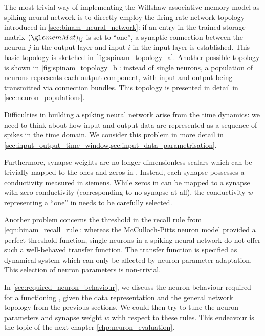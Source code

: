 The most trivial way of implementing the Willshaw associative memory model as spiking neural network is to directly employ the firing-rate network topology introduced in \cref{sec:binam_neural_network}: if an entry in the trained storage matrix \((\memMat)_{ij}\) is set to \enquote{one}, a synaptic connection between the neuron $j$ in the output layer and input $i$ in the input layer is established. This basic topology is sketched in \cref{fig:spinam_topology_a}. Another possible topology is shown in \cref{fig:spinam_topology_b}: instead of single neurons, a population of neurons represents each output component, with input and output being transmitted via connection bundles. This topology is presented in detail in \cref{sec:neuron_populations}.

Difficulties in building a spiking neural network arise from the time dynamics: we need to think about how input and output data are represented as a sequence of spikes in the time domain. We consider this problem in more detail in \cref{sec:input_output_time_window,sec:input_data_parametrisation}.

Furthermore, synapse weights are no longer dimensionless scalars which can be trivially mapped to the ones and zeros in \memMat. Instead, each synapse possesses a conductivity measured in siemens. While zeros in \memMat can be mapped to a synapse with zero conductivity (corresponding to no synapse at all), the conductivity $w$ representing a \enquote{one} in \memMat needs to be carefully selected.

Another problem concerns the threshold in the \BiNAM recall rule from \cref{eqn:binam_recall_rule}: whereas the McCulloch-Pitts neuron model provided a perfect threshold function, single neurons in a spiking neural network do not offer such a well-behaved transfer function. The transfer function is specified as dynamical system which can only be affected by neuron parameter adaptation. This selection of neuron parameters is non-trivial.

In \cref{sec:required_neuron_behaviour}, we discuss the neuron behaviour required for a functioning \BiNAM, given the data representation and the general network topology from the previous sections. We could then try to tune the neuron parameters and synapse weight \(w\) with respect to these rules. This endeavour is the topic of the next chapter \ref{chp:neuron_evaluation}.

